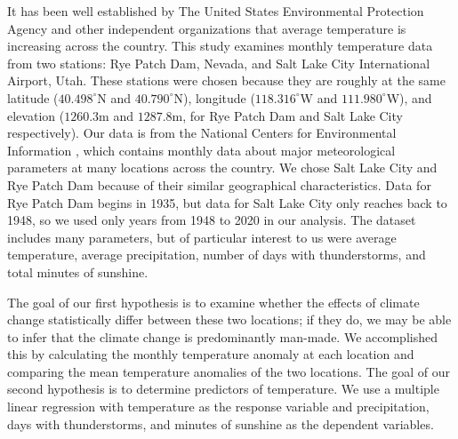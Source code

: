 It has been well established by The United States Environmental Protection Agency and other independent organizations that average temperature is increasing across the country. This study examines monthly temperature data from two stations: Rye Patch Dam, Nevada, and Salt Lake City International Airport, Utah. These stations were chosen because they are roughly at the same latitude ($40.498^{\circ}$N and $40.790^{\circ}$N), longitude ($118.316^{\circ}$W and $111.980^{\circ}$W), and elevation ($1260.3$m and $1287.8$m, for Rye Patch Dam and Salt Lake City respectively). Our data is from the National Centers for Environmental Information \cite{gsom_data}, which contains monthly data about major meteorological parameters at many locations across the country. We chose Salt Lake City and Rye Patch Dam because of their similar geographical characteristics. Data for Rye Patch Dam begins in 1935, but data for Salt Lake City only reaches back to 1948, so we used only years from 1948 to 2020 in our analysis. The dataset includes many parameters, but of particular interest to us were average temperature, average precipitation, number of days with thunderstorms, and total minutes of sunshine.

The goal of our first hypothesis is to examine whether the effects of climate change statistically differ between these two locations; if they do, we may be able to infer that the climate change is predominantly man-made. We accomplished this by calculating the monthly temperature anomaly at each location and comparing the mean temperature anomalies of the two locations. The goal of our second hypothesis is to determine predictors of temperature. We use a multiple linear regression with temperature as the response variable and precipitation, days with thunderstorms, and minutes of sunshine as the dependent variables.